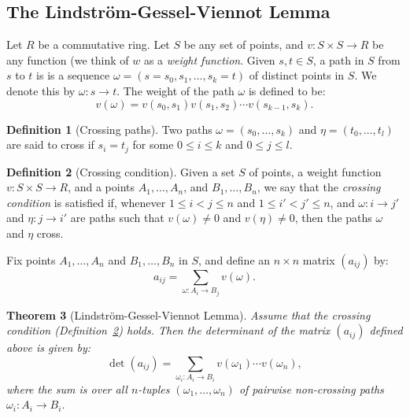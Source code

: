\documentclass[11pt]{amsart}
\newtheorem{theorem}{Theorem}[subsection]
\theoremstyle{definition}
\newtheorem{definition}[theorem]{Definition}
\theoremstyle{example}
\begin{document}
\subsection{The Lindstr\"om-Gessel-Viennot Lemma}
\label{sec:lgv}
Let $R$ be a commutative ring.
Let $S$ be any set of points, and $v:S\times S\to R$ be any function (we think of $w$ as a \emph{weight function}.
Given $s, t\in S$, a path in $S$ from $s$ to $t$ is is a sequence $\omega=(s=s_0,s_1,\dotsc,s_k=t)$ of distinct points in $S$.
We denote this by $\omega:s\to t$.
The weight of the path $\omega$ is defined to be:
\begin{displaymath}
  v(\omega) = v(s_0,s_1)v(s_1,s_2)\dotsb v(s_{k-1}, s_k).
\end{displaymath}
\begin{definition}
  [Crossing paths]
  Two paths $\omega=(s_0,\dotsc, s_k)$ and $\eta=(t_0,\dotsc,t_l)$ are said to cross if $s_i= t_j$ for some $0\leq i \leq k$ and $0\leq j \leq l$.
\end{definition}
\begin{definition}
  [Crossing condition]
  \label{definition:crossing-condition}
  Given a set $S$ of points, a weight function $v:S\times S\to R$, and a points $A_1,\dotsc,A_n$, and $B_1,\dotsc, B_n$, we say that the \emph{crossing condition} is satisfied if, whenever $1\leq i<j\leq n$ and $1\leq i'<j'\leq n$, and $\omega:i \to j'$ and $\eta: j\to i'$ are paths such that $v(\omega)\neq 0$ and $v(\eta)\neq 0$, then the paths $\omega$ and $\eta$ cross.
\end{definition}
Fix points $A_1,\dotsc, A_n$ and $B_1,\dotsc, B_n$ in $S$, and define an $n\times n$ matrix $(a_{ij})$ by:
\begin{displaymath}
  a_{ij} = \sum_{\omega:A_i\to B_j} v(\omega).
\end{displaymath}
\begin{theorem}
  [Lindstr\"om-Gessel-Viennot Lemma]
  \label{lemma:lgv}
  Assume that the crossing condition (Definition~\ref{definition:crossing-condition}) holds.
  Then the determinant of the matrix $(a_{ij})$ defined above is given by:
  \begin{equation}
    \label{eq:lgv}
    \det(a_{ij}) = \sum_{\omega_i:A_i\to B_i} v(\omega_1)\dotsb v(\omega_n),
  \end{equation}
  where the sum is over all $n$-tuples $(\omega_1,\dotsc, \omega_n)$ of pairwise non-crossing paths $\omega_i:A_i\to B_i$.
\end{theorem}
\end{document}
